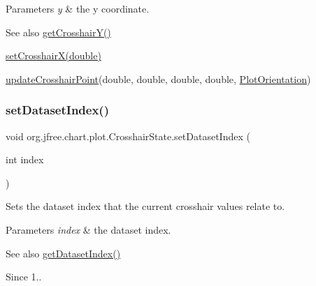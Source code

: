 \begin{DoxyParams}{Parameters}
{\em y} & the y coordinate.\\
\hline
\end{DoxyParams}
\begin{DoxySeeAlso}{See also}
\mbox{\hyperlink{classorg_1_1jfree_1_1chart_1_1plot_1_1_crosshair_state_a406ee4f64d870eb091754cd148d77f1c}{get\+Crosshair\+Y()}} 

\mbox{\hyperlink{classorg_1_1jfree_1_1chart_1_1plot_1_1_crosshair_state_a14e7d9a337753cc7a70144d5f29d65a4}{set\+Crosshair\+X(double)}} 

\mbox{\hyperlink{classorg_1_1jfree_1_1chart_1_1plot_1_1_crosshair_state_abaabe9519089405293d06a56ffdd4f39}{update\+Crosshair\+Point}}(double, double, double, double, \mbox{\hyperlink{classorg_1_1jfree_1_1chart_1_1plot_1_1_plot_orientation}{Plot\+Orientation}}) 
\end{DoxySeeAlso}
\mbox{\label{classorg_1_1jfree_1_1chart_1_1plot_1_1_crosshair_state_af26dcaa885914e377a9e3493045c331d}} 
\subsubsection{\texorpdfstring{set\+Dataset\+Index()}{setDatasetIndex()}}
{\footnotesize\ttfamily void org.\+jfree.\+chart.\+plot.\+Crosshair\+State.\+set\+Dataset\+Index (\begin{DoxyParamCaption}\item[{int}]{index }\end{DoxyParamCaption})}

Sets the dataset index that the current crosshair values relate to.


\begin{DoxyParams}{Parameters}
{\em index} & the dataset index.\\
\hline
\end{DoxyParams}
\begin{DoxySeeAlso}{See also}
\mbox{\hyperlink{classorg_1_1jfree_1_1chart_1_1plot_1_1_crosshair_state_ab81dcb895b605a2fc1dde15aa3dc2538}{get\+Dataset\+Index()}}
\end{DoxySeeAlso}
\begin{DoxySince}{Since}
1.. 
\end{DoxySince}
\mbox{\label{classorg_1_1jfree_1_1chart_1_1plot_1_1_crosshair_state_abaabe9519089405293d06a56ffdd4f39}} 
